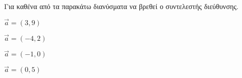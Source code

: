 Για καθένα από τα παρακάτω διανύσματα να βρεθεί ο συντελεστής διεύθυνσης.
\begin{multicols}{2}
\begin{alist}
\item $ \vec{a}=(3,9) $
\item $ \vec{a}=(-4,2) $
\item $ \vec{a}=(-1,0) $
\item $ \vec{a}=(0,5) $
\end{alist}
\end{multicols}
